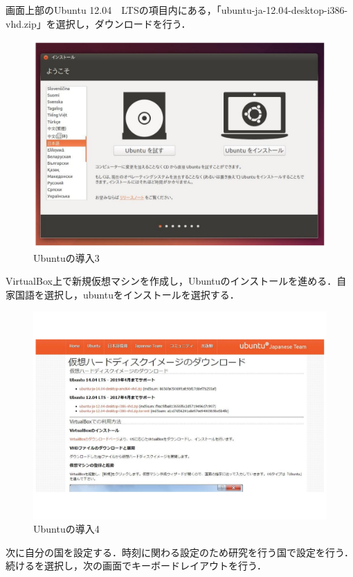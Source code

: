 画面上部のUbuntu 12.04　LTSの項目内にある，「ubuntu-ja-12.04-desktop-i386-vhd.zip」を選択し，ダウンロードを行う．

\begin{figure}[H]
\centering
\includegraphics[width=13cm]{ins.pdf}
\caption{Ubuntuの導入3}\label{sannp}
\end{figure}

VirtualBox上で新規仮想マシンを作成し，Ubuntuのインストールを進める．自家国語を選択し，ubuntuをインストールを選択する．

\begin{figure}[H]
\centering
\includegraphics[width=13cm]{figure10.pdf}
\caption{Ubuntuの導入4}\label{sannp}
\end{figure}

次に自分の国を設定する．時刻に関わる設定のため研究を行う国で設定を行う．続けるを選択し，次の画面でキーボードレイアウトを行う．

